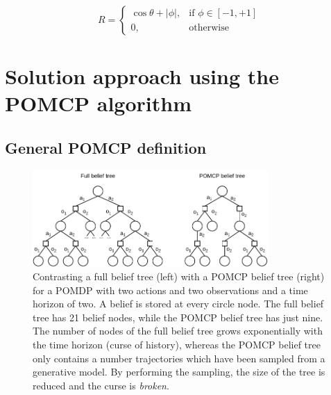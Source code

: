 \begin{equation}
    \label{eq:reward}
    R = 
    \begin{cases}
        \cos \theta + |\phi|,& \text{if } \phi \in [-1,+1]\\
        0,              & \text{otherwise}
    \end{cases}
\end{equation}

\section{Solution approach using the POMCP algorithm}

\subsection{General POMCP definition}
\label{sec:pomcp}




\begin{figure}[htbp]
    \centering
    \includegraphics[width=0.8\textwidth]{figures/pomcp_belief_tree.pdf}
    \caption[A full belief tree in contrast with a POMCP belief tree]{Contrasting a full belief tree (left) with a POMCP belief tree (right) for a POMDP with two actions and two observations and a time horizon of two. A belief is stored at every circle node. The full belief tree has 21 belief nodes, while the POMCP belief tree has just nine. The number of nodes of the full belief tree grows exponentially with the time horizon (curse of history), whereas the POMCP belief tree only contains a number trajectories which have been sampled from a generative model. By performing the sampling, the size of the tree is reduced and the curse is \textit{broken}.}
    \label{fig:full_vs_pomcp}
\end{figure}

